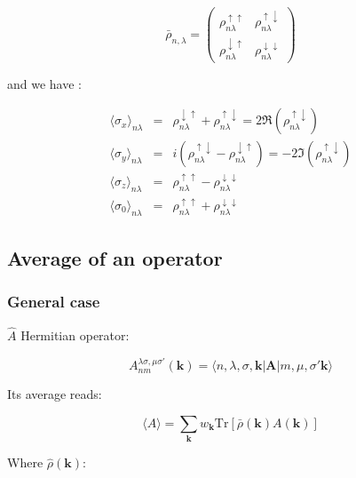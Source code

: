 \documentclass{article}
\newcommand{\op}[1]{\hat{#1}}
\begin{document}
\[ \bar{\rho}_{n,\lambda}=
\left( \begin{array}{cc} \rho_{n \lambda}^{\uparrow \uparrow} & \rho_{n 
\lambda}^{\uparrow \downarrow} \\
\rho_{n \lambda}^{\downarrow \uparrow} & \rho_{n\lambda}^{\downarrow 
\downarrow}
\end{array} \right) \]



\noindent
and we have :

\[ \begin{array}{lcl} 
\langle \sigma_x \rangle_{n \lambda}&=&     \rho^{\downarrow \uparrow}_{n \lambda} +  \rho^{\uparrow \downarrow}_{n \lambda} = 2\Re(\rho^{\uparrow \downarrow}_{n \lambda}) \\ 
\langle\sigma_y\rangle_{n \lambda}&=&   i(\rho^{\uparrow \downarrow}_{n \lambda} -  \rho^{\downarrow \uparrow}_{n \lambda})= -2\Im(\rho^{\uparrow \downarrow}_{n \lambda}) \\ 
\langle\sigma_z\rangle_{n \lambda}&=&     \rho^{\uparrow \uparrow}_{n \lambda}    -  \rho^{\downarrow \downarrow}_{n \lambda} \\
\langle\sigma_0\rangle_{n \lambda}&=&     \rho^{\uparrow \uparrow}_{n \lambda}    +  \rho^{\downarrow \downarrow}_{n \lambda}
\end{array}
\]

\noindent



\subsection{Average of an operator}

\subsubsection{General case}

\noindent
$\op{A}$ Hermitian operator:

\[\displaystyle A_{nm}^{\lambda \sigma,\mu \sigma'}(\mathbf{k})=
\langle n,\lambda,\sigma,\mathbf{k}|{\bm A}| m,\mu,
\sigma'\mathbf{k}\rangle \]


\noindent
Its average reads:

\[ \langle A \rangle =\sum_{\mathbf{k}} w_{\mathbf{k}} \text{Tr} \left[\bar{\rho}(\mathbf{k}) A(\mathbf{k}) \right] \]

\noindent
Where $\hat{\rho}(\mathbf{k})$:
\end{document}
